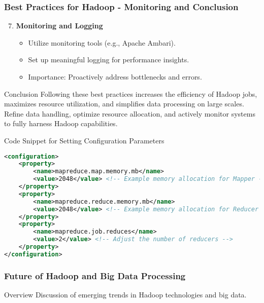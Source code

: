 \documentclass[aspectratio=169]{beamer}
\begin{document}
\begin{frame}[fragile]
    \frametitle{Best Practices for Hadoop - Monitoring and Conclusion}
    \begin{enumerate}
        \setcounter{enumi}{6}  %
        \item \textbf{Monitoring and Logging}
        \begin{itemize}
            \item Utilize monitoring tools (e.g., Apache Ambari).
            \item Set up meaningful logging for performance insights.
            \item Importance: Proactively address bottlenecks and errors.
        \end{itemize}
    \end{enumerate}

    \begin{block}{Conclusion}
        Following these best practices increases the efficiency of Hadoop jobs, maximizes resource utilization, and simplifies data processing on large scales. Refine data handling, optimize resource allocation, and actively monitor systems to fully harness Hadoop capabilities.
    \end{block}

    \begin{block}{Code Snippet for Setting Configuration Parameters}
    \begin{lstlisting}[language=xml]
<configuration>
    <property>
        <name>mapreduce.map.memory.mb</name>
        <value>2048</value> <!-- Example memory allocation for Mapper -->
    </property>
    <property>
        <name>mapreduce.reduce.memory.mb</name>
        <value>2048</value> <!-- Example memory allocation for Reducer -->
    </property>
    <property>
        <name>mapreduce.job.reduces</name>
        <value>2</value> <!-- Adjust the number of reducers -->
    </property>
</configuration>
    \end{lstlisting}
    \end{block}
\end{frame}

\begin{frame}
  \frametitle{Future of Hadoop and Big Data Processing}
  \begin{block}{Overview}
    Discussion of emerging trends in Hadoop technologies and big data.
  \end{block}
\end{frame}
\end{document}
